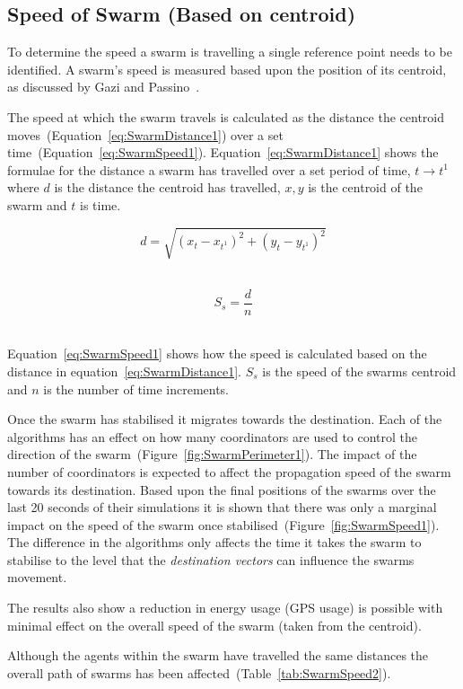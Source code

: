 \subsection{Speed of Swarm (Based on centroid)}
To determine the speed a swarm is travelling a single reference point needs to be identified. A swarm's speed is measured based upon the position of its centroid, as discussed by Gazi and Passino~\cite{GP:04, GP:02}.

The speed at which the swarm travels is calculated as the distance the centroid moves~(Equation~\ref{eq:SwarmDistance1}) over a set time~(Equation~\ref{eq:SwarmSpeed1}). Equation~\ref{eq:SwarmDistance1} shows the formulae for the distance a swarm has travelled over a set period of time, $t \rightarrow t^{1}$ where $d$ is the distance the centroid has travelled, $x,y$ is the centroid of the swarm and $t$ is time.

\begin{equation}\label{eq:SwarmDistance1}
d = \sqrt{(x_{t}-x_{t^1})^2+(y_{t}-y_{t^1})^2}
\end{equation}‎

\begin{equation}\label{eq:SwarmSpeed1}
S_s = \frac{d}{n}
\end{equation}‎

Equation~\ref{eq:SwarmSpeed1} shows how the speed is calculated based on the distance in equation~\ref{eq:SwarmDistance1}. $S_s$ is the speed of the swarms centroid and $n$ is the number of time increments.

Once the swarm has stabilised it migrates towards the destination. Each of the algorithms has an effect on how many coordinators are used to control the direction of the swarm~(Figure~\ref{fig:SwarmPerimeter1}). The impact of the number of coordinators is expected to affect the propagation speed of the swarm towards its destination. Based upon the final positions of the swarms over the last 20 seconds of their simulations it is shown that there was only a marginal impact on the speed of the swarm once stabilised~(Figure~\ref{fig:SwarmSpeed1}). The difference in the algorithms only affects the time it takes the swarm to stabilise to the level that the \textit{destination vectors} can influence the swarms movement.

The results also show a reduction in energy usage (GPS usage) is possible with minimal effect on the overall speed of the swarm (taken from the centroid). 

Although the agents within the swarm have travelled the same distances the overall path of swarms has been affected~(Table~\ref{tab:SwarmSpeed2}).

